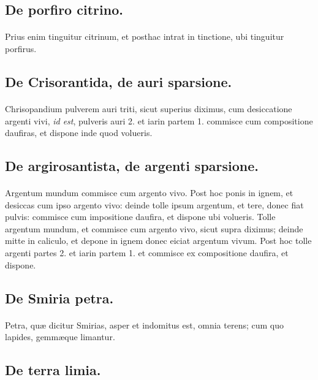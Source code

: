 \documentclass[a4paper, 11pt, oneside, polutonikogreek, italian]{article}
\begin{document}
\subsection{De porfiro citrino.}
\paragraph{}
Prius enim tinguitur citrinum, et posthac intrat in tinctione, ubi tinguitur porfirus.

\subsection{De Crisorantida, de auri sparsione.}
\paragraph{}
Chrisopandium pulverem auri triti, sicut superius diximus, cum desiccatione argenti vivi, \emph{id est}, pulveris auri 2. et iarin partem 1. commisce cum compositione daufiras, et dispone inde quod volueris.

\subsection{De argirosantista, de argenti sparsione.}
\paragraph{}
Argentum mundum commisce cum argento vivo. Post hoc ponis in ignem, et desiccas cum ipso argento vivo: deinde tolle ipsum argentum, et tere, donec fiat pulvis: commisce cum impositione daufira, et dispone ubi volueris. Tolle argentum mundum, et commisce cum argento vivo, sicut supra diximus; deinde mitte in caliculo, et depone in ignem donec eiciat argentum vivum. Post hoc tolle argenti partes 2. et iarin partem 1. et commisce ex compositione daufira, et dispone.

\subsection{De Smiria petra.}
\paragraph{}
Petra, quæ dicitur Smirias, asper et indomitus est, omnia terens; cum quo lapides, gemmæque limantur.

\subsection{De terra limia.}
\end{document}
